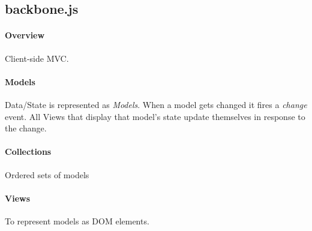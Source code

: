 \documentclass[11pt]{article} %
\begin{document}
\subsection{backbone.js}

\paragraph{Overview} Client-side MVC.

\paragraph{Models} Data/State is represented as \emph{Models}. When a model gets changed it fires a \emph{change}
event. All Views that display that model's state update themselves in response to the change.

\paragraph{Collections} Ordered sets of models

\paragraph{Views} To represent models as DOM elements.
\end{document}
